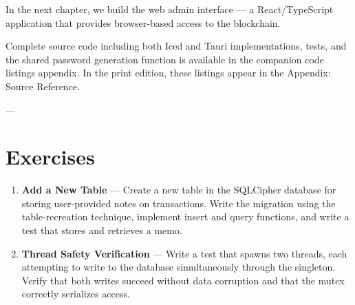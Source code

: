In the next chapter, we build the web admin interface --- a React/TypeScript application that provides browser-based access to the blockchain.

\begin{infobox}
Complete source code including both Iced and Tauri implementations, tests, and the shared password generation function is available in the companion code listings appendix. In the print edition, these listings appear in the Appendix: Source Reference.
\end{infobox}

---

\section{Exercises}
\label{sec:ch20-exercises}

\begin{enumerate}
  \item \textbf{Add a New Table} --- Create a new  table in the SQLCipher database for storing user-provided notes on transactions. Write the migration using the table-recreation technique, implement insert and query functions, and write a test that stores and retrieves a memo.

  \item \textbf{Thread Safety Verification} --- Write a test that spawns two threads, each attempting to write to the database simultaneously through the  singleton. Verify that both writes succeed without data corruption and that the mutex correctly serializes access.
\end{enumerate}
